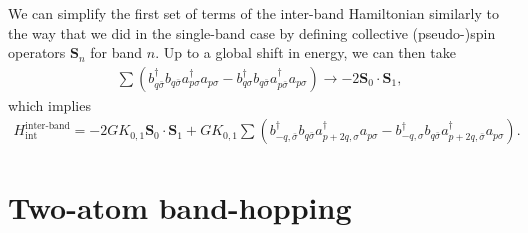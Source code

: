 \documentclass[aps,notitlepage,nofootinbib,11pt]{revtex4-1}
\renewcommand{\t}{\text} %
\newcommand{\p}[1]{\left(#1\right)} %
\renewcommand{\v}{\bm} %
\renewcommand{\c}{\cdot} %
\newcommand{\1}{\mathds{1}}
\begin{document}
We can simplify the first set of terms of the inter-band Hamiltonian
similarly to the way that we did in the single-band case by defining
collective (pseudo-)spin operators $\v S_n$ for band $n$.  Up to a
global shift in energy, we can then take
\begin{align}
  \sum \p{b_{q\bar\sigma}^\dag b_{q\bar\sigma} a_{p\sigma}^\dag a_{p\sigma}
    - b_{q\sigma}^\dag b_{q\bar\sigma} a_{p\bar\sigma}^\dag a_{p\sigma}}
  \to -2\v S_0\c\v S_1,
\end{align}
which implies
\begin{align}
  H_{\t{int}}^{\t{inter-band}}
  = -2 G K_{0,1} \v S_0\c\v S_1
  + G K_{0,1} \sum
  \p{b_{-q,\bar\sigma}^\dag b_{q\bar\sigma} a_{p+2q,\sigma}^\dag a_{p\sigma}
    - b_{-q,\sigma}^\dag b_{q\bar\sigma} a_{p+2q,\bar\sigma}^\dag a_{p\sigma}}.
\end{align}


\section{Two-atom band-hopping}
\end{document}
